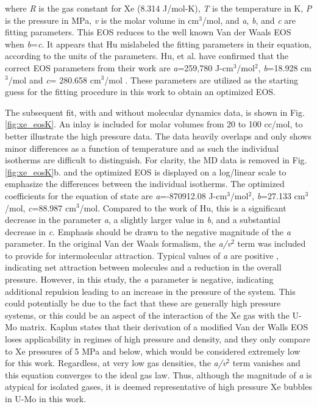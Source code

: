 \documentclass[review]{elsarticle}
\begin{document}
where \textit{R} is the gas constant for Xe (8.314 J/mol-K\cite{kaplun2003}), \textit{T} is the temperature in K, \textit{P} is the pressure in MPa, \textit{v} is the molar volume in cm$^3$/mol, and \textit{a}, \textit{b}, and \textit{c} are fitting parameters. This EOS reduces to the well known Van der Waals EOS when \textit{b}=\textit{c}. It appears that Hu \cite{hu2017} mislabeled the fitting parameters in their equation, according to the units of the parameters. Hu, et al. have confirmed that the correct EOS parameters from their work are \textit{a}=259,780 J-cm$^3$/mol$^2$, \textit{b}=18.928 cm$^3$/mol and \textit{c}= 280.658 cm$^3$/mol \cite{hu2017}. These parameters are utilized as the starting guess for the fitting procedure in this work to obtain an optimized EOS. 

The subsequent fit, with and without molecular dynamics data, is shown in Fig. \ref{fig:xe_eosK}. An inlay is included for molar volumes from 20 to 100 cc/mol, to better illustrate the high pressure data. The data heavily overlaps and only shows minor differences as a function of temperature and as such the individual isotherms are difficult to distinguish. For clarity, the MD data is removed in Fig. \ref{fig:xe_eosK}b. and the optimized EOS is displayed on a log/linear scale to emphasize the differences between the individual isotherms. The optimized coefficients for the equation of state are \textit{a}=-870912.08 J-cm$^3$/mol$^2$, \textit{b}=27.133 cm$^3$/mol, \textit{c}=88.987 cm$^3$/mol. Compared to the work of Hu, this is a significant decrease in the parameter \textit{a}, a slightly larger value in \textit{b}, and a substantial decrease in \textit{c}. Emphasis should be drawn to the negative magnitude of the \textit{a} parameter. In the original Van der Waals formalism, the \textit{a/v$^2$} term was included to provide for intermolecular attraction. Typical values of \textit{a} are positive \cite{kaplun2003}, indicating net attraction between molecules and a reduction in the overall pressure. However, in this study, the \textit{a} parameter is negative, indicating additional repulsion leading to an increase in the pressure of the system. This could potentially be due to the fact that these are generally high pressure systems, or this could be an aspect of the interaction of the Xe gas with the U-Mo matrix. Kaplun states that their derivation of a modified Van der Walls EOS loses applicability in regimes of high pressure and density, and they only compare to Xe pressures of 5 MPa and below, which would be considered extremely low for this work. Regardless, at very low gas densities, the \textit{a/v$^2$} term vanishes and this equation converges to the ideal gas law. Thus, although the magnitude of \textit{a} is atypical for isolated gases, it is deemed representative of high pressure Xe bubbles in U-Mo in this work.
\end{document}
